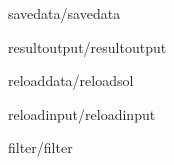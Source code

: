 \documentclass[a4paper,english,10pt]{report}    %
\newcommand{\Include}{}
\begin{document}
\graphicspath{{./}{savedata/}}
\Include{savedata/savedata}

\graphicspath{{./}{resultoutput/}}
\Include{resultoutput/resultoutput}

\graphicspath{{./}{reloaddata/}}
\Include{reloaddata/reloadsol}

\graphicspath{{./}{reloadinput/}}
\Include{reloadinput/reloadinput}

\graphicspath{{./}{filter/}}
\Include{filter/filter}


\printindex

\end{document}
